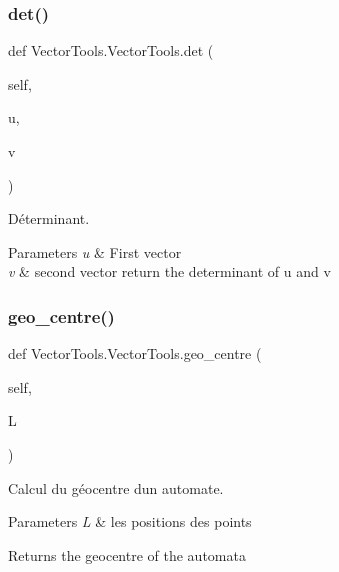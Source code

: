 \subsubsection{\texorpdfstring{det()}{det()}}
{\footnotesize\ttfamily def Vector\+Tools.\+Vector\+Tools.\+det (\begin{DoxyParamCaption}\item[{}]{self,  }\item[{}]{u,  }\item[{}]{v }\end{DoxyParamCaption})}



Déterminant. 


\begin{DoxyParams}{Parameters}
{\em u} & First vector \\
\hline
{\em v} & second vector return the determinant of u and v \\
\hline
\end{DoxyParams}
\mbox{\label{classVectorTools_1_1VectorTools_a572c397af3e343d6e53b22d8db133a12}} 
\subsubsection{\texorpdfstring{geo\_centre()}{geo\_centre()}}
{\footnotesize\ttfamily def Vector\+Tools.\+Vector\+Tools.\+geo\+\_\+centre (\begin{DoxyParamCaption}\item[{}]{self,  }\item[{}]{L }\end{DoxyParamCaption})}



Calcul du géocentre d\textquotesingle{}un automate. 


\begin{DoxyParams}{Parameters}
{\em L} & les positions des points \\
\hline
\end{DoxyParams}
\begin{DoxyReturn}{Returns}
the geocentre of the automata 
\end{DoxyReturn}
\mbox{\label{classVectorTools_1_1VectorTools_af874616506959d3d545fc9e48e589e4a}} 
